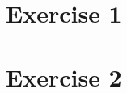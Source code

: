 \documentclass{scrartcl}
\begin{document}
\section*{Exercise 1}



\pagebreak

\section*{Exercise 2}



\pagebreak


% 



% 



% 
\end{document}
